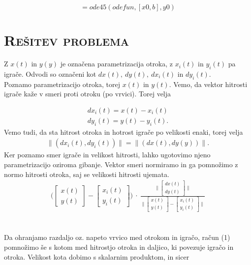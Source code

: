 \documentclass[a4paper,12pt]{article}
\begin{document}
\begin{displaymath}
[X, Y] = ode45(odefun, [x0, b], y0)
\end{displaymath}

\section{\textsc{\large{Rešitev problema}}}

Z $x(t)$ in $y(y)$ je označena parametrizacija otroka, z $x_i(t)$ in $y_i(t)$ pa igrače. Odvodi so označeni kot $dx(t), \ dy(t), \ dx_i(t)$ in $dy_i(t)$. \\
Poznamo parametrizacijo otroka, torej $x(t)$ in $y(t)$. Vemo, da vektor hitrosti igrače kaže v smeri proti otroku (po vrvici).
Torej velja

\begin{align*}
    dx_i(t) = x(t) - x_i(t) \\
    dy_i(t) = y(t) - y_i(t).
\end{align*}
Vemo tudi, da sta hitrost otroka in hotrost igrače po velikosti enaki, torej velja
\begin{align*}
    \|(dx_i(t), dy_i(t))\| = \|(dx(t), dy(y))\|.
\end{align*}
Ker poznamo smer igrače in velikost hitrosti, lahko ugotovimo njeno parametrizacijo oziroma gibanje.
Vektor smeri normiramo in ga pomnožimo z normo hitrosti otroka, saj se velikosti hitrosti ujemata.
\\
\begin{align}
     \Big(
    \begin{bmatrix} 
        x(t) \\
        y(t)
    \end{bmatrix}
    -
    \begin{bmatrix} 
        x_i(t) \\
        y_i(t) 
    \end{bmatrix}
    \Big)
    \ \cdot \
    \frac{
    \Big \|
    \begin{bmatrix} 
        dx(t) \\
        dy(t)
    \end{bmatrix}
    \Big \|
    }
    {
    \Big \|
    \begin{bmatrix} 
        x(t) \\
        y(t)
    \end{bmatrix}
    -
    \begin{bmatrix} 
        x_i(t) \\
        y_i(t) 
    \end{bmatrix}
    \Big \|
    }
\end{align}
\\
\\
Da ohranjamo razdaljo oz. napeto vrvico med otrokom in igračo, račun (1) pomnožimo še 
s kotom med hitrostjo otroka in daljico, ki povezuje igračo in otroka. 
Velikost kota dobimo s skalarnim produktom, in sicer
\end{document}

